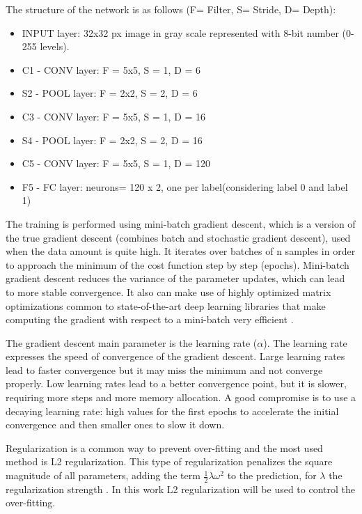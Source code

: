 \documentclass[]{article}
\begin{document}
The structure of the network is as follows (F= Filter, S= Stride, D= Depth):
\begin{itemize}
	\item INPUT layer: 32x32 px image in gray scale represented with 8-bit number (0-255 levels).
	\item C1 - CONV layer: F = 5x5, S = 1, D = 6
	\item S2 - POOL layer: F = 2x2, S = 2, D = 6
	\item C3 - CONV layer: F = 5x5, S = 1, D = 16
	\item S4 - POOL layer: F = 2x2, S = 2, D = 16
	\item C5 - CONV layer: F = 5x5, S = 1, D = 120
	\item F5 - FC layer: neurons= 120 x 2, one per label(considering label 0 and label 1)
\end{itemize}

The training is performed using mini-batch gradient descent, which is a version of the true gradient descent (combines batch and stochastic gradient descent), used when the data amount is quite high. It iterates over batches of n samples in order to approach the minimum of the cost function step by step (epochs). Mini-batch gradient descent reduces the variance of the parameter updates, which can lead to more stable convergence. It also can make use of highly optimized matrix optimizations common to state-of-the-art deep learning libraries that make computing the gradient with respect to a mini-batch very efficient \cite{ruderweb}.

The gradient descent main parameter is the learning rate ($\alpha$). The learning rate expresses the speed of convergence of the gradient descent. Large learning rates lead to faster convergence but it may miss the minimum and not converge properly. Low learning rates lead to a better convergence point, but it is slower, requiring more steps and more memory allocation. A good compromise is to use a decaying learning rate: high values for the first epochs to accelerate the initial convergence and then smaller ones to slow it down. 

Regularization is a common way to prevent over-fitting and the most used method is L2 regularization. This type of regularization penalizes the square magnitude of all parameters, adding the term $\frac{1}{2}\lambda \omega ^2$ to the prediction, for $\lambda$ the regularization strength \cite{cs231convnets}. In this work L2 regularization will be used to control the over-fitting.
\end{document}
